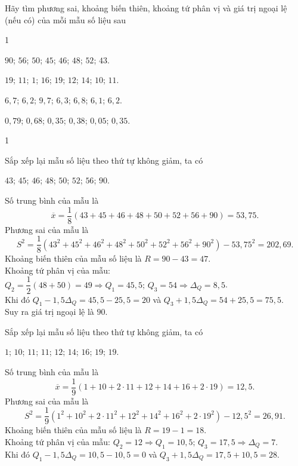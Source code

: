\begin{bt}%
	Hãy tìm phương sai, khoảng biến thiên, khoảng tứ phân vị và giá trị ngoại lệ (nếu có) của mỗi mẫu số liệu sau
	\begin{enumEX}[a)]{1}
		\item $90$; $56$; $50$; $45$; $46$; $48$; $52$; $43$.
		\item $19$; $11$; $1$; $16$; $19$; $12$; $14$; $10$; $11$.
		\item $6{,}7$; $6{,}2$; $9{,}7$; $6{,}3$; $6{,}8$; $6{,}1$; $6{,}2$.
		\item $0{,}79$; $0{,}68$; $0{,}35$; $0{,}38$; $0{,}05$; $0{,}35$.
	\end{enumEX}
	\loigiai
	{
		\begin{enumEX}[a)]{1}
			\item Sắp xếp lại mẫu số liệu theo thứ tự không giảm, ta có 
			\begin{center}
				$43$; $45$; $46$; $48$; $50$; $52$; $56$; $90$.
			\end{center}
			Số trung bình của mẫu là $$\overline{x}=\dfrac{1}{8}\left(43+45+46+48+50+52+56+90\right)=53{,}75.$$
			Phương sai của mẫu là $$S^2=\dfrac{1}{8}\left(43^2+45^2+46^2+48^2+50^2+52^2+56^2+90^2\right)-53{,}75^2=202{,}69.$$
			Khoảng biến thiên của mẫu số liệu là $R=90-43=47$.\\
			Khoảng tứ phân vị của mẫu:  $Q_2=\dfrac{1}{2}\left(48+50\right)=49\Rightarrow Q_1=45{,}5;\, Q_3=54\Rightarrow \Delta_Q=8{,}5$.\\
			Khi đó $Q_1-1{,}5\Delta_Q=45{,}5-25{,}5=20$ và $Q_3+1{,}5\Delta_Q=54+25{,}5=75{,}5$.\\
			Suy ra giá trị ngoại lệ là $90$.
			\item Sắp xếp lại mẫu số liệu theo thứ tự không giảm, ta có 
			\begin{center}
				$1$; $10$; $11$; $11$; $12$; $14$; $16$; $19$; $19$.
			\end{center}
			Số trung bình của mẫu là $$\overline{x}=\dfrac{1}{9}\left(1+10+2\cdot 11+12+14+16+2\cdot 19\right)=12{,}5.$$
			Phương sai của mẫu là $$S^2=\dfrac{1}{9}\left(1^2+10^2+2\cdot 11^2+12^2+14^2+16^2+2\cdot 19^2\right)-12{,}5^2=26{,}91.$$
			Khoảng biến thiên của mẫu số liệu là $R=19-1=18$.\\
			Khoảng tứ phân vị của mẫu:  $Q_2=12\Rightarrow Q_1=10{,}5;\, Q_3=17{,}5\Rightarrow \Delta_Q=7$.\\
			Khi đó $Q_1-1{,}5\Delta_Q=10{,}5-10{,}5=0$ và $Q_3+1{,}5\Delta_Q=17{,}5+10{,}5=28$.\\

\end{enumEX}}
\end{bt}
